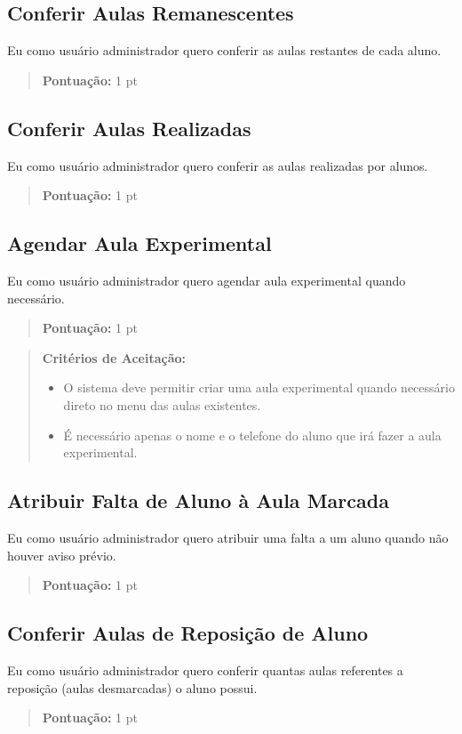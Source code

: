 \subsection[Conferir Aulas Remanescentes]{Conferir Aulas Remanescentes}
Eu como usuário administrador quero conferir as aulas restantes de cada aluno.
\begin{quote}
    \textbf{Pontuação:} 1 pt
\end{quote}

\subsection[Conferir Aulas Realizadas]{Conferir Aulas Realizadas}
Eu como usuário administrador quero conferir as aulas realizadas por alunos.
\begin{quote}
    \textbf{Pontuação:} 1 pt
\end{quote}

\subsection[Agendar Aula Experimental]{Agendar Aula Experimental}
Eu como usuário administrador quero agendar aula experimental quando necessário.
\begin{quote}
    \textbf{Pontuação:} 1 pt
\end{quote}
\begin{quote}
\textbf{Critérios de Aceitação:}
    \begin{itemize}
        \item O sistema deve permitir criar uma aula experimental quando necessário direto
        no menu das aulas existentes.
        \item É necessário apenas o nome e o telefone do aluno que irá fazer a aula
        experimental.
    \end{itemize}
\end{quote}

\subsection[Atribuir Falta de Aluno à Aula Marcada]{Atribuir Falta de Aluno à Aula Marcada}
Eu como usuário administrador quero atribuir uma falta a um aluno quando não
houver aviso prévio.
\begin{quote}
    \textbf{Pontuação:} 1 pt
\end{quote}

\subsection[Conferir Aulas de Reposição de Aluno]{Conferir Aulas de Reposição de Aluno}
Eu como usuário administrador quero conferir quantas aulas referentes a
reposição (aulas desmarcadas) o aluno possui.
\begin{quote}
    \textbf{Pontuação:} 1 pt
\end{quote}

